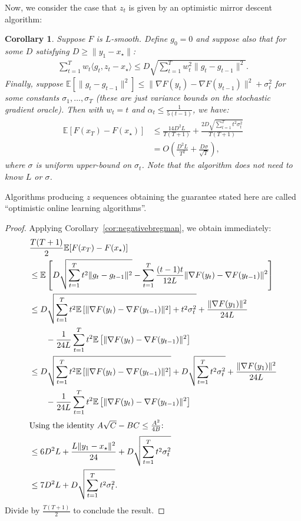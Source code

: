 \documentclass{article}
\newtheorem{corollary}{Corollary}
\newcommand{\E}{\mathbb{E}}
\begin{document}
Now, we consider the case that $z_t$ is given by an optimistic mirror descent algorithm:

\begin{corollary}\label{cor:adaptaccel}
Suppose $F$ is $L$-smooth. Define $g_0=0$ and suppose also that for some $D$ satisfying $D\ge  \|y_1-x_\star\|$:
\begin{align*}
    \sum_{t=1}^T w_t \langle g_t, z_t-x_\star\rangle \le D\sqrt{\sum_{t=1}^T w_t^2 \|g_t- g_{t-1}\|^2} .
\end{align*}
Finally, suppose $\mathbb{E}[\|g_t-g_{t-1}\|^2]\le \|\nabla F(y_t) - \nabla F(y_{t-1})\|^2 + \sigma_t^2$ for some constants $\sigma_1,\dots,\sigma_T$ (these are just variance bounds on the stochastic gradient oracle).
Then with $w_t = t$ and $\alpha_t \le \frac{1}{5(t-1)}$, we have:
\begin{align*}
    \mathbb{E}[F(x_T) - F(x_\star)]&\le \frac{14 D^2 L}{T(T+1)} + \frac{2D\sqrt{\sum_{t=1}^T t^2 \sigma_t^2}}{T(T+1)}\\
    &= O\left(\frac{D^2L}{T^2} + \frac{D\sigma}{\sqrt{T}}\right),
\end{align*}
where $\sigma$ is uniform upper-bound on $\sigma_t$. Note that the algorithm does not need to know $L$ or $\sigma$.
\end{corollary}
Algorithms producing $z$ sequences obtaining the guarantee stated here are called ``optimistic online learning algorithms''.
\begin{proof}
Applying Corollary~\ref{cor:negativebregman}, we obtain immediately:
\begin{align*}
    &\frac{T(T+1)}{2}\E[F(x_T) - F(x_\star)] \\
    &\le  \E\left[ D\sqrt{\sum_{t=1}^T t^2 \|g_t -g_{t-1}\|^2} -\sum_{t=1}^T \frac{(t-1)t}{12L}\|\nabla F(y_t) - \nabla F(y_{t-1})\|^2\right]\\
    &\le  D\sqrt{\sum_{t=1}^T t^2\E\left[ \|\nabla F(y_t) -\nabla F(y_{t-1})\|^2\right] + t^2 \sigma_t^2} +\frac{\|\nabla F(y_1)\|^2}{24L}\\
    &\qquad-\frac{1}{24L}\sum_{t=1}^Tt^2\E\left[\|\nabla F(y_t) - \nabla F(y_{t-1})\|^2\right]\\
    &\le  D\sqrt{\sum_{t=1}^T t^2\E\left[ \|\nabla F(y_t) -\nabla F(y_{t-1})\|^2\right]} + D\sqrt{\sum_{t=1}^T t^2 \sigma_t^2} +\frac{\|\nabla F(y_1)\|^2}{24L}\\
    &\qquad-\frac{1}{24L}\sum_{t=1}^Tt^2\E\left[\|\nabla F(y_t) - \nabla F(y_{t-1})\|^2\right]\\
    \intertext{Using the identity $A\sqrt{C}-BC\le \frac{A^2}{4B}$:}
    &\le  6D^2L + \frac{L\|y_1-x_\star\|^2}{24}+ D\sqrt{\sum_{t=1}^T t^2\sigma_t^2}\\
    &\le 7D^2L + D\sqrt{\sum_{t=1}^T t^2\sigma_t^2}.
\end{align*}
Divide by $\frac{T(T+1)}{2}$ to conclude the result.
\end{proof}
\end{document}
